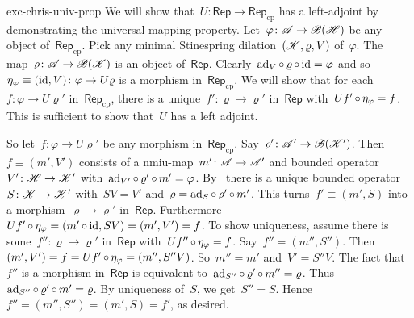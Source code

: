 \documentclass[b5page]{book}
\begin{document}
\begin{solution}{exc-chris-univ-prop}%
We will show that~$U\colon \mathsf{Rep} \to \mathsf{Rep}_{\mathrm{cp}}$
    has a left-adjoint by demonstrating the universal mapping property.
    Let~$\varphi\colon \mathscr{A} \to \mathscr{B}(\mathscr{H})$ be any object of~$\mathsf{Rep}_{\mathrm{cp}}$.
    Pick any minimal Stinespring dilation~$(\mathscr{K}, \varrho, V)$ of~$\varphi$.
The map~$\varrho\colon \mathscr{A}\to \mathscr{B}(\mathscr{K})$ is an object
        of~$\mathsf{Rep}$.
Clearly~$\mathrm{ad}_V \mathop{\circ} \varrho \mathop{\circ} \mathrm{id} = \varphi$
    and so~$\eta_\varphi\equiv (\mathrm{id},V)\colon \varphi \to U\varrho$
        is a morphism in~$\mathsf{Rep}_{\mathrm{cp}}$.
We will show that for each~$f\colon \varphi \to U\varrho'$
        in~$\mathsf{Rep}_{\mathrm{cp}}$,
    there is a unique~$f'\colon \varrho \to \varrho'$
    in~$\mathsf{Rep}$ with~$Uf' \mathop{\circ} \eta_\varphi = f$.
This is sufficient to show that~$U$
    has a left adjoint.

    So let~$f\colon \varphi\to U\varrho'$ be any morphism
        in~$\mathsf{Rep}_{\mathrm{cp}}$.
Say~$\varrho'\colon \mathscr{A}' \to \mathscr{B}(\mathscr{K}')$.
    Then~$f \equiv (m', V')$ consists of
    a nmiu-map~$m'\colon \mathscr{A} \to \mathscr{A}'$
    and bounded operator~$V' \colon \mathscr{H} \to \mathscr{K}'$
    with~$\mathrm{ad}_{V'} \mathop{\circ} \varrho' \mathop{\circ} m' = \varphi$.
By~
    there is a unique bounded operator~$S\colon \mathscr{K} \to \mathscr{K}'$
        with~$SV = V'$ and~$\varrho = \mathrm{ad}_S \mathop{\circ} \varrho' \mathop{\circ} m'$.
This turns~$f' \equiv(m',S)$ into a
    morphism~$\varrho \to \varrho'$ in~$\mathsf{Rep}$.
Furthermore~$Uf' \mathop{\circ} \eta_\varphi
                = (m' \mathop{\circ} \mathrm{id}, SV) = (m',V') = f$.
To show uniqueness, assume
        there is some~$f'' \colon \varrho \to \varrho'$
        in~$\mathsf{Rep}$
        with~$Uf'' \mathop{\circ} \eta_\varphi = f$.
Say~$f'' = (m'',S'')$.
    Then~$(m',V') = f = Uf' \mathop{\circ} \eta_\varphi = (m'', S''V)$.
So~$m''=m'$ and~$V' = S''V$.
The fact that~$f''$ is a morphism in~$\mathsf{Rep}$
    is
    equivalent to~$\mathrm{ad}_{S''} \mathop{\circ} \varrho' \mathop{\circ} m'' = \varrho$.
Thus~$\mathrm{ad}_{S''} \mathop{\circ} \varrho' \mathop{\circ} m' = \varrho$.
By uniqueness of~$S$, we get~$S'' = S$.
    Hence~$f''=(m'',S'') = (m',S) = f'$, as desired.
\end{solution}
\end{document}
